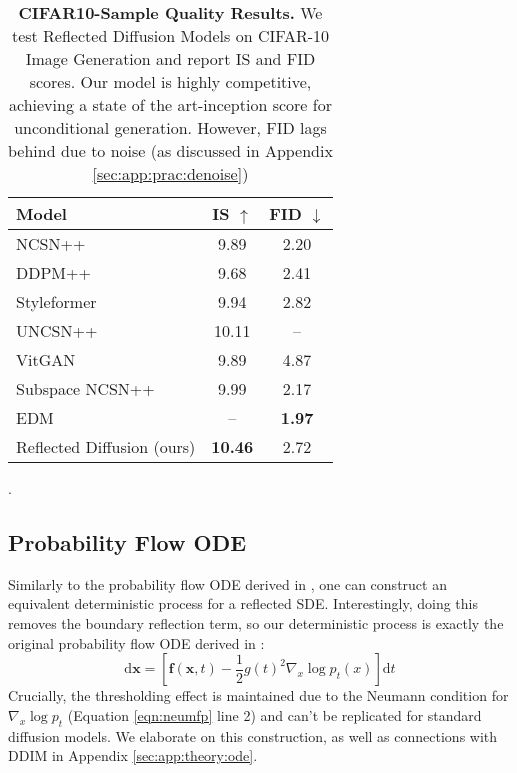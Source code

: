 \documentclass{article}
\theoremstyle{plain}
\theoremstyle{definition}
\theoremstyle{remark}
\newcommand{\sqbrac}[1]{\left[#1\right]}
\newcommand{\grad}{\nabla}
\renewcommand{\vec}{\mathbf}
\newcommand{\dd}{\mathrm{d}}
\begin{document}
\begin{table}[t]
    \centering
    \begin{tabular}{l c c}
        Model & IS $\uparrow$ & FID $\downarrow$\\
        \hline
        NCSN++ \citep{Song2020ScoreBasedGM} & 9.89 & 2.20\\
        DDPM++ \citep{Song2020ScoreBasedGM} & 9.68 & 2.41\\
        Styleformer \citep{Park2021StyleformerTB} & 9.94 & 2.82\\
        UNCSN++ \citep{Kim2021SoftTA} & 10.11 & --\\
        VitGAN \citep{Lee2021ViTGANTG} & 9.89 & 4.87\\
        Subspace NCSN++ \citep{Jing2022SubspaceDG} & 9.99 & 2.17\\
        EDM \citep{Karras2022ElucidatingTD} & -- & \textbf{1.97}\\
        \hline
        Reflected Diffusion (ours) & \textbf{10.46} & 2.72\\
    \end{tabular}
    \caption{\textbf{CIFAR10-Sample Quality Results.} We test Reflected Diffusion Models on CIFAR-10 Image Generation and report IS and FID scores. Our model is highly competitive, achieving a state of the art-inception score for unconditional generation. However, FID lags behind due to noise (as discussed in Appendix \ref{sec:app:prac:denoise})}.
    \label{tab:cifar10results}
    \vspace{-5mm}
\end{table}

\subsection{Probability Flow ODE}

Similarly to the probability flow ODE derived in \citet{Song2020ScoreBasedGM}, one can construct an equivalent deterministic process for a reflected SDE. Interestingly, doing this removes the boundary reflection term, so our deterministic process is exactly the original probability flow ODE derived in \citet{Song2020ScoreBasedGM}:
\begin{equation}\label{eqn:ode}
    \dd \vec{x} = \sqbrac{\vec{f}(\vec{x}, t) - \frac{1}{2}g(t)^2 \grad_x \log p_t(x)}\dd t
\end{equation}
Crucially, the thresholding effect is maintained due to the Neumann condition for $\grad_x \log p_t$ (Equation \ref{eqn:neumfp} line 2) and can't be replicated for standard diffusion models. We elaborate on this construction, as well as connections with DDIM \citep{Song2020DenoisingDI} in Appendix \ref{sec:app:theory:ode}.
\end{document}
